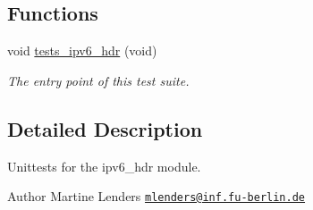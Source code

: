 \subsection*{Functions}
\begin{DoxyCompactItemize}
\item 
void \hyperlink{group__unittests_ga24225364efd039f0cdd38e4286bed7c5}{tests\+\_\+ipv6\+\_\+hdr} (void)
\begin{DoxyCompactList}\small\item\em The entry point of this test suite. \end{DoxyCompactList}\end{DoxyCompactItemize}


\subsection{Detailed Description}
Unittests for the {\ttfamily ipv6\+\_\+hdr} module. 

\begin{DoxyAuthor}{Author}
Martine Lenders \href{mailto:mlenders@inf.fu-berlin.de}{\tt mlenders@inf.\+fu-\/berlin.\+de} 
\end{DoxyAuthor}
